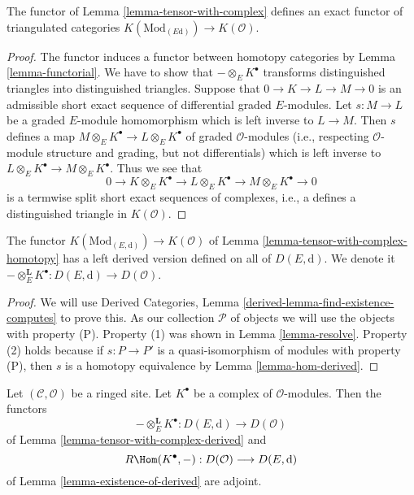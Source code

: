 \begin{lemma}
\label{lemma-tensor-with-complex-homotopy}
The functor of Lemma \ref{lemma-tensor-with-complex} defines an exact functor
of triangulated categories
$K(\text{Mod}_{(E \text{d})}) \to K(\mathcal{O})$.
\end{lemma}

\begin{proof}
The functor induces a functor between homotopy categories by
Lemma \ref{lemma-functorial}.
We have to show that $- \otimes_E K^\bullet$ transforms distinguished
triangles into distinguished triangles.
Suppose that $0 \to K \to L \to M \to 0$ is an admissible short
exact sequence of differential graded $E$-modules. Let $s : M \to L$ be
a graded $E$-module homomorphism which is left inverse to $L \to M$.
Then $s$ defines a map $M \otimes_E K^\bullet \to L \otimes_E K^\bullet$
of graded $\mathcal{O}$-modules (i.e., respecting $\mathcal{O}$-module
structure and grading, but not differentials)
which is left inverse to $L \otimes_E K^\bullet \to M \otimes_E K^\bullet$.
Thus we see that
$$
0 \to K \otimes_E K^\bullet \to L \otimes_E K^\bullet \to
M \otimes_E K^\bullet \to 0
$$
is a termwise split short exact sequences of complexes, i.e., a
defines a distinguished triangle in $K(\mathcal{O})$.
\end{proof}

\begin{lemma}
\label{lemma-tensor-with-complex-derived}
The functor $K(\text{Mod}_{(E, \text{d})}) \to K(\mathcal{O})$
of Lemma \ref{lemma-tensor-with-complex-homotopy} has a left derived
version defined on all of $D(E, \text{d})$. We denote it
$- \otimes_E^\mathbf{L} K^\bullet : D(E, \text{d}) \to D(\mathcal{O})$.
\end{lemma}

\begin{proof}
We will use
Derived Categories, Lemma \ref{derived-lemma-find-existence-computes}
to prove this. As our collection $\mathcal{P}$
of objects we will use the objects with property (P).
Property (1) was shown in Lemma \ref{lemma-resolve}.
Property (2) holds because if $s : P \to P'$ is a quasi-isomorphism
of modules with property (P), then $s$ is a homotopy equivalence
by Lemma \ref{lemma-hom-derived}.
\end{proof}

\begin{lemma}
\label{lemma-tensor-with-complex-hom-adjoint}
Let $(\mathcal{C}, \mathcal{O})$ be a ringed site.
Let $K^\bullet$ be a complex of $\mathcal{O}$-modules.
Then the functors
$$
- \otimes_E^\mathbf{L} K^\bullet :
D(E, \text{d})
\longrightarrow
D(\mathcal{O})
$$
of Lemma \ref{lemma-tensor-with-complex-derived} and
$$
R\Hom(K^\bullet, -) : D(\mathcal{O}) \longrightarrow D(E, \text{d})
$$
of Lemma \ref{lemma-existence-of-derived} are adjoint.
\end{lemma}

